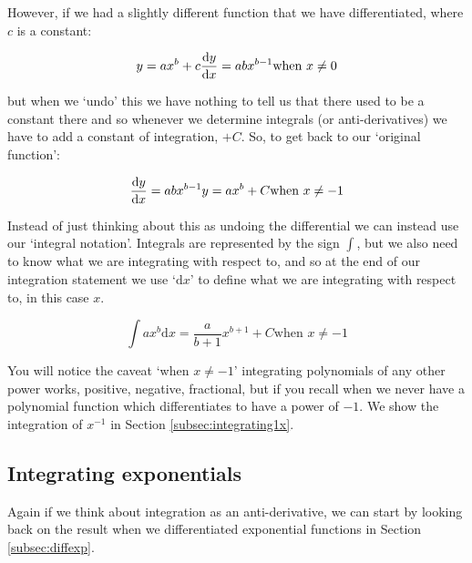 \documentclass[
]{book}
\begin{document}
However, if we had a slightly different function that we have differentiated, where \(c\) is a constant:

\begin{equation*}
y = ax^b+ c\\
\frac{\textrm{d}y}{\textrm{d}x}=abx^{b-1}\\
\textrm{when } x \neq 0
\end{equation*}

but when we `undo' this we have nothing to tell us that there used to be a constant there and so whenever we determine integrals (or anti-derivatives) we have to add a constant of integration, \(+C\). So, to get back to our `original function':

\begin{equation*}
\frac{\textrm{d}y}{\textrm{d}x}=abx^{b-1}\\
y = ax^b+C\\
\textrm{when } x \neq -1
\end{equation*}

Instead of just thinking about this as undoing the differential we can instead use our `integral notation'. Integrals are represented by the sign \(\int\), but we also need to know what we are integrating with respect to, and so at the end of our integration statement we use `\(\textrm{d}x\)' to define what we are integrating with respect to, in this case \(x\).

\begin{equation}
\int ax^b \textrm{d}x = \frac{a}{b+1}x^{b+1}+C
\textrm{when } x \neq -1
\label{eq:intpoly}
\end{equation}

You will notice the caveat `when \(x \neq -1\)' integrating polynomials of any other power works, positive, negative, fractional, but if you recall when we never have a polynomial function which differentiates to have a power of \(-1\). We show the integration of \(x^{-1}\) in Section \ref{subsec:integrating1x}.

\hypertarget{subsec:integratingexponentials}{%
\subsection{Integrating exponentials}\label{subsec:integratingexponentials}}

Again if we think about integration as an anti-derivative, we can start by looking back on the result when we differentiated exponential functions in Section \ref{subsec:diffexp}.
\end{document}
